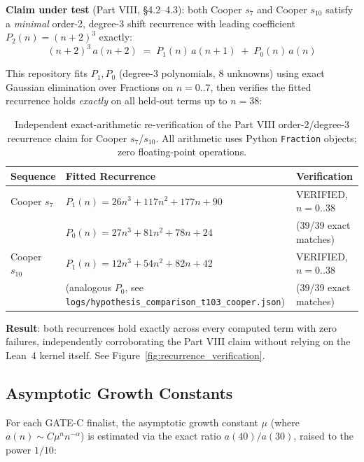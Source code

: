 \textbf{Claim under test} (Part VIII, \S4.2--4.3): both Cooper $s_7$ and
Cooper $s_{10}$ satisfy a \emph{minimal} order-2, degree-3 shift recurrence
with leading coefficient $P_2(n) = (n+2)^3$ exactly:
\begin{equation}
(n+2)^3\, a(n+2) \;=\; P_1(n)\, a(n+1) \;+\; P_0(n)\, a(n)
\end{equation}

This repository fits $P_1, P_0$ (degree-3 polynomials, 8 unknowns) using exact
Gaussian elimination over Fractions on $n=0..7$, then verifies the fitted
recurrence holds \emph{exactly} on all held-out terms up to $n=38$:

\begin{table}[h]
\centering
\begin{tabular}{lll}
\toprule
\textbf{Sequence} & \textbf{Fitted Recurrence} & \textbf{Verification} \\
\midrule
Cooper $s_7$ & $P_1(n)=26n^3+117n^2+177n+90$ & VERIFIED, $n=0..38$ \\
 & $P_0(n)=27n^3+81n^2+78n+24$ & (39/39 exact matches) \\
\addlinespace
Cooper $s_{10}$ & $P_1(n)=12n^3+54n^2+82n+42$ & VERIFIED, $n=0..38$ \\
 & (analogous $P_0$, see \texttt{logs/hypothesis\_comparison\_t103\_cooper.json}) & (39/39 exact matches) \\
\bottomrule
\end{tabular}
\caption{Independent exact-arithmetic re-verification of the Part VIII order-2/degree-3 recurrence claim for Cooper $s_7$/$s_{10}$. All arithmetic uses Python \texttt{Fraction} objects; zero floating-point operations.}
\label{tab:recurrence_reverification}
\end{table}

\textbf{Result}: both recurrences hold exactly across every computed term with
zero failures, independently corroborating the Part VIII claim without relying
on the Lean~4 kernel itself. See Figure~\ref{fig:recurrence_verification}.

\subsection{Asymptotic Growth Constants}

For each GATE-C finalist, the asymptotic growth constant $\mu$ (where $a(n)
\sim C \mu^n n^{-\alpha}$) is estimated via the exact ratio $a(40)/a(30)$,
raised to the power $1/10$:

